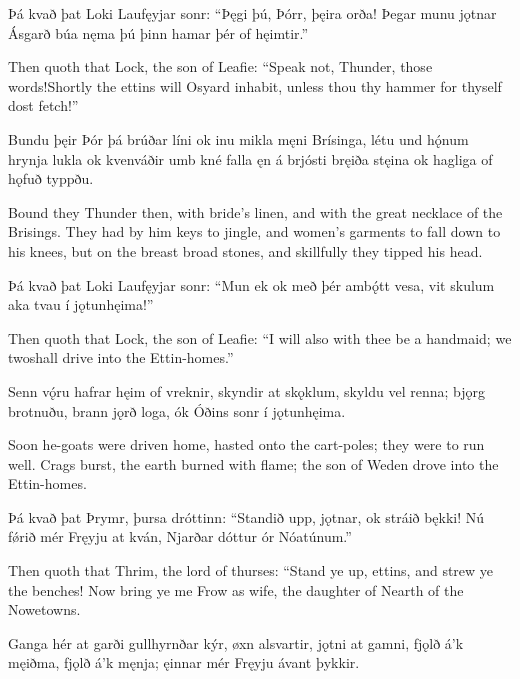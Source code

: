 Þá kvað þat Loki \hld Laufęyjar sonr:
“Þęgi þú, Þórr, \hld þęira orða!
Þegar munu jǫtnar \hld Ásgarð búa
nęma þú þinn hamar \hld þér of hęimtir.”

Then quoth that Lock, the son of Leafie: “Speak not, Thunder, those words!\footnotemark[1] Shortly the ettins will Osyard inhabit, unless thou thy hammer for thyself dost fetch!”

Bundu þęir Þór þá \hld brúðar líni
ok inu mikla \hld męni Brísinga,
létu und hǫ́num \hld hrynja lukla
ok kvenváðir \hld umb kné falla
ęn á brjósti \hld bręiða stęina
ok hagliga \hld of hǫfuð typpðu.

Bound they Thunder then, with bride’s linen, and with the great necklace of the Brisings. They had by him keys to jingle, and women's garments to fall down to his knees, but on the breast broad stones, and skillfully they tipped his head.

Þá kvað þat Loki \hld Laufęyjar sonr:
“Mun ek ok með þér \hld ambǫ́tt vesa,
vit skulum aka tvau \hld í jǫtunhęima!”

Then quoth that Lock, the son of Leafie: “I will also with thee be a handmaid; we two\footnotemark[1] shall drive into the Ettin-homes.”

Senn vǫ́ru hafrar \hld hęim of vreknir,
skyndir at skǫklum, \hld skyldu vel renna;
bjǫrg brotnuðu, \hld brann jǫrð loga,
ók Óðins sonr \hld í jǫtunhęima.

Soon he-goats were driven home, hasted onto the cart-poles; they were to run well. Crags burst, the earth burned with flame; the son of Weden drove into the Ettin-homes.\footnotemark[1]

Þá kvað þat Þrymr, \hld þursa dróttinn:
“Standið upp, jǫtnar, \hld ok stráið bękki!
Nú fǿrið mér \hld Fręyju at kván,
Njarðar dóttur \hld ór Nóatúnum.”

Then quoth that Thrim, the lord of thurses: “Stand ye up, ettins, and strew ye the benches! Now bring ye me Frow as wife, the daughter of Nearth of the Nowetowns.

Ganga hér at garði \hld gullhyrnðar kýr,
øxn alsvartir, \hld jǫtni at gamni,
fjǫlð á’k męiðma, \hld fjǫlð á’k męnja;
ęinnar mér Fręyju \hld ávant þykkir.

